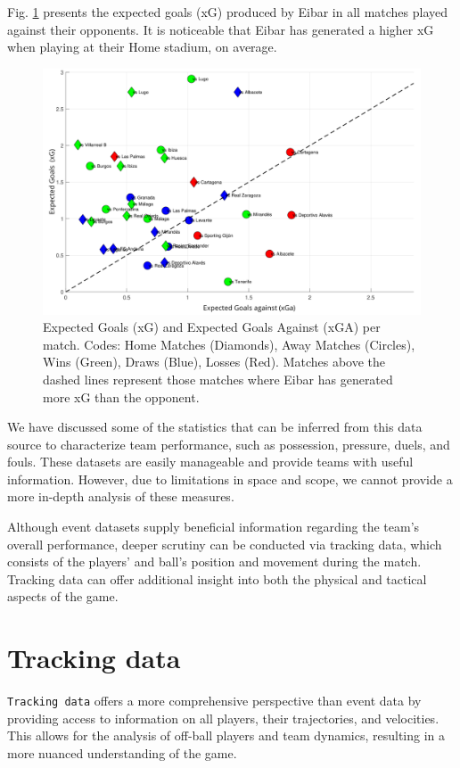 \documentclass[
  10pt,
  twoside,nohyper]{book}
\begin{document}
Fig. \ref{fig:xg-xga} presents the expected goals (xG) produced by Eibar in all matches played against their opponents. It is noticeable that Eibar has generated a higher xG when playing at their Home stadium, on average.

\begin{figure}[H]

{\centering \includegraphics[width=0.8\linewidth,]{imagenes/scat-xG-xGa} 

}

\caption{Expected Goals (xG) and Expected Goals Against (xGA) per match. Codes: Home Matches (Diamonds), Away Matches (Circles), Wins (Green), Draws (Blue), Losses (Red). Matches above the dashed lines represent those matches where Eibar has generated more xG than the opponent.}\label{fig:xg-xga}
\end{figure}

We have discussed some of the statistics that can be inferred from this data source to characterize team performance, such as possession, pressure, duels, and fouls. These datasets are easily manageable and provide teams with useful information. However, due to limitations in space and scope, we cannot provide a more in-depth analysis of these measures.

Although event datasets supply beneficial information regarding the team's overall performance, deeper scrutiny can be conducted via tracking data, which consists of the players' and ball's position and movement during the match. Tracking data can offer additional insight into both the physical and tactical aspects of the game.

\section{Tracking data}\label{tracking-data}

\texttt{Tracking\ data} offers a more comprehensive perspective than event data by providing access to information on all players, their trajectories, and velocities. This allows for the analysis of off-ball players and team dynamics, resulting in a more nuanced understanding of the game.
\end{document}
